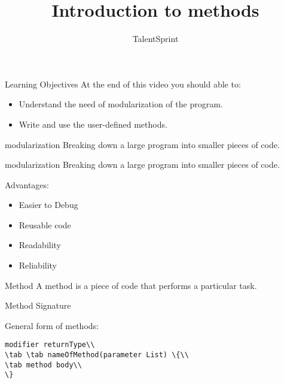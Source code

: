 \documentclass[aspectratio=169,14pt,usenames,dvipsnames]{beamer}
\title[Introduction to methods]{Introduction to methods}
\newcommand\tab[1][1cm]{\hspace*{#1}}
\begin{document}
{\1
\begin{frame} \vspace{35pt}

\subtitle{TalentSprint}
\maketitle
\end{frame}
}


\begin{frame}{Learning Objectives}
At the end of this video you should able to:
\begin{itemize}
\item Understand the need of modularization of
the program.
\item Write and use the user-defined methods.
\end{itemize}
\end{frame}


\begin{frame}{modularization}
Breaking down a large program into smaller
pieces of code.
\end{frame}

\begin{frame}{modularization}
Breaking down a large program into smaller
pieces of code.
\begin{block}{Advantages:}
\begin{itemize}
    \item Easier to Debug
    \item Reusable code
    \item Readability 
    \item Reliability
\end{itemize}
\end{block}
\end{frame}

\begin{frame}{Method}
A method is a piece of code that performs a
particular task.
\end{frame}

\begin{frame}{Method Signature}
\begin{block}{General form of methods:}\\
\begin{lstlisting}
modifier returnType\\
\tab \tab nameOfMethod(parameter List) \{\\
\tab method body\\
\}
\end{lstlisting}
\end{block}
\end{frame}
\end{document}
